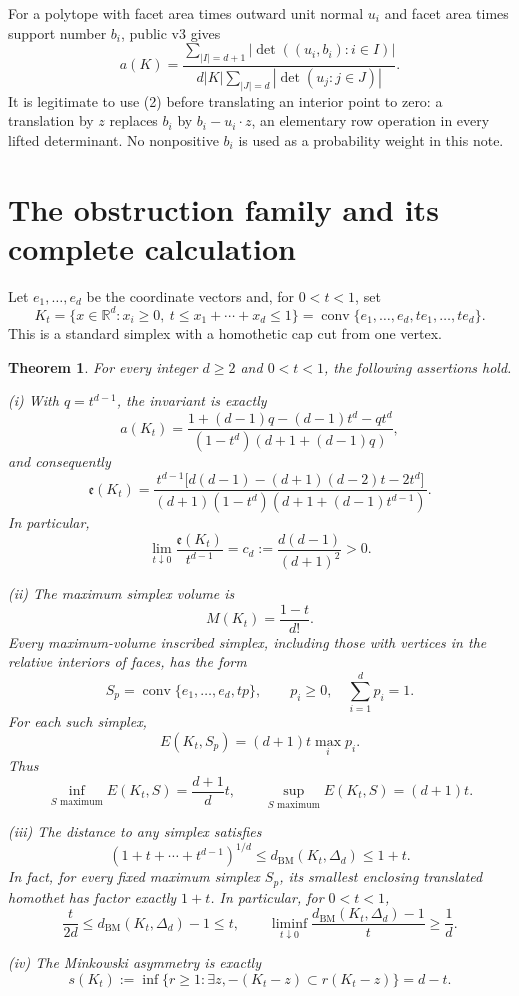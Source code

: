 \documentclass[11pt]{article}
\newtheorem{theorem}{Theorem}
\newcommand{\conv}{\operatorname{conv}}
\newcommand{\BM}{d_{\mathrm{BM}}}
\newcommand{\ee}{\mathfrak e}
\begin{document}
For a polytope with facet area times outward unit normal $u_i$ and facet area
times support number $b_i$, public v3 gives
\[
 a(K)=\frac{\displaystyle\sum_{|I|=d+1}
       |\det((u_i,b_i):i\in I)|}
 {d|K|\displaystyle\sum_{|J|=d}|\det(u_j:j\in J)|}.
 \tag{2}
\]
It is legitimate to use (2) before translating an interior point to zero:
a translation by $z$ replaces $b_i$ by $b_i-u_i\cdot z$, an elementary row
operation in every lifted determinant. No nonpositive $b_i$ is used as a
probability weight in this note.

\section{The obstruction family and its complete calculation}

Let $e_1,\ldots,e_d$ be the coordinate vectors and, for $0<t<1$, set
\[
 K_t=\{x\in\mathbb R^d:x_i\ge0,\ t\le x_1+\cdots+x_d\le1\}
     =\conv\{e_1,\ldots,e_d,te_1,\ldots,te_d\}.
 \tag{3}
\]
This is a standard simplex with a homothetic cap cut from one vertex.

\begin{theorem}\label{thm:exact}
For every integer $d\ge2$ and $0<t<1$, the following assertions hold.

\medskip\noindent
\textup{(i)} With $q=t^{d-1}$, the invariant is exactly
\[
 a(K_t)=
 \frac{1+(d-1)q-(d-1)t^d-qt^d}
 {(1-t^d)(d+1+(d-1)q)},
 \tag{4}
\]
and consequently
\[
 \ee(K_t)=
 \frac{t^{d-1}\bigl[d(d-1)-(d+1)(d-2)t-2t^d\bigr]}
 {(d+1)(1-t^d)(d+1+(d-1)t^{d-1})}.
 \tag{5}
\]
In particular,
\[
 \lim_{t\downarrow0}\frac{\ee(K_t)}{t^{d-1}}
   =c_d:=\frac{d(d-1)}{(d+1)^2}>0.
 \tag{6}
\]

\medskip\noindent
\textup{(ii)} The maximum simplex volume is
\[
 M(K_t)=\frac{1-t}{d!}.
 \tag{7}
\]
Every maximum-volume inscribed simplex, including those with vertices in the
relative interiors of faces, has the form
\[
 S_p=\conv\{e_1,\ldots,e_d,tp\},\qquad
 p_i\ge0,\quad\sum_{i=1}^d p_i=1.
 \tag{8}
\]
For each such simplex,
\[
 E(K_t,S_p)=(d+1)t\max_i p_i.
 \tag{9}
\]
Thus
\[
 \inf_{S\text{ maximum}}E(K_t,S)=\frac{d+1}{d}t,
 \qquad
 \sup_{S\text{ maximum}}E(K_t,S)=(d+1)t.
 \tag{10}
\]

\medskip\noindent
\textup{(iii)} The distance to any simplex satisfies
\[
 \left(1+t+\cdots+t^{d-1}\right)^{1/d}
 \le \BM(K_t,\Delta_d)\le 1+t.
 \tag{11}
\]
In fact, for every fixed maximum simplex $S_p$, its smallest enclosing
\emph{translated} homothet has factor exactly $1+t$.
In particular, for $0<t<1$,
\[
 \frac{t}{2d}\le \BM(K_t,\Delta_d)-1\le t,
 \qquad
 \liminf_{t\downarrow0}\frac{\BM(K_t,\Delta_d)-1}{t}\ge\frac1d.
 \tag{12}
\]

\medskip\noindent
\textup{(iv)} The Minkowski asymmetry is exactly
\[
 s(K_t):=\inf\{r\ge1:\exists z,
              -(K_t-z)\subset r(K_t-z)\}=d-t.
 \tag{13}
\]
\end{theorem}
\end{document}
